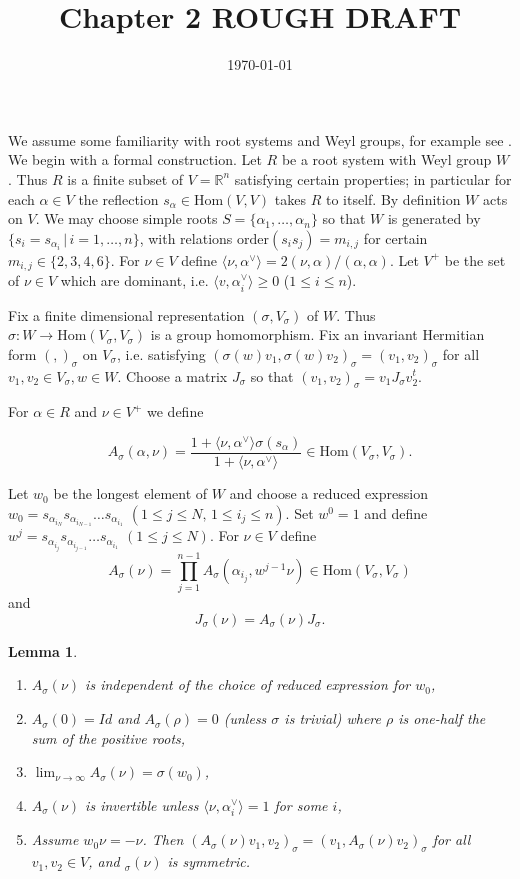 \documentclass[11pt]{amsart}
\newtheorem{lemma}[equation]{Lemma}
\newcommand{\R}{{\mathbb R}}
\newcommand{\ch}[1]{#1^\vee}
\newcommand\brach[2]{\langle#1,\ch#2\rangle}
\newcommand{\Hom}{\text{Hom}}
\begin{document}
\title{Chapter 2 ROUGH DRAFT}
\date{\today}
\maketitle

We assume some familiarity with root systems and Weyl groups, for example see 
\cite{humphreys_coxeter}.
We begin with a formal construction.  Let $R$ be a root system with
Weyl group $W$. Thus $R$ is a finite subset of $V=\R^n$ satisfying
certain properties; in particular for each $\alpha\in V$ the
reflection $s_\alpha\in \Hom(V,V)$ takes $R$ to itself.  By
definition $W$ acts on $V$. We may choose simple roots
$S=\{\alpha_1,\dots, \alpha_n\}$ so that $W$ is generated by
$\{s_i=s_{\alpha_i}\,|\,i=1,\dots,n\}$, with relations
$\text{order}(s_is_j)=m_{i,j}$ for certain $m_{i,j}\in\{2,3,4,6\}$.
For $\nu\in V$ define $\brach \nu\alpha=2(\nu,\alpha)/(\alpha,\alpha)$. 
Let $V^+$ be the set of $\nu\in V$ which are dominant, i.e.
$\brach v{\alpha_i}\ge0$ ($1\le i\le n$).

Fix a finite dimensional representation $(\sigma,V_\sigma)$ of $W$.
Thus $\sigma:W\rightarrow \Hom(V_\sigma,V_\sigma)$ is a group
homomorphism. Fix an invariant Hermitian form $(,)_\sigma$ on
$V_\sigma$, i.e. satisfying
$(\sigma(w)v_1,\sigma(w)v_2)_\sigma=(v_1,v_2)_\sigma$ for all $v_1,v_2\in
V_\sigma, w\in W$. 
Choose a matrix $J_\sigma$ so that $(v_1,v_2)_\sigma=v_1J_\sigma v_2^t$.


For $\alpha\in R$ and  $\nu\in V^+$ we define 

\begin{equation}
\label{A}
A_\sigma(\alpha,\nu)=\frac{1+\brach\nu{\alpha}\sigma(s_{\alpha})}{1+\brach\nu{\alpha}}
\in\Hom(V_\sigma,V_\sigma).
\end{equation}



Let $w_0$ be the longest element of $W$ and choose a reduced expression
$w_0=s_{\alpha_{i_N}}s_{\alpha_{i_{N-1}}}\dots s_{\alpha_{i_1}}$
$(1\le j\le N,\,1\le i_j\le n)$.
Set $w^0=1$  and define
$w^j=s_{\alpha_{i_j}}s_{\alpha_{i_{j-1}}}\dots s_{\alpha_{i_1}}$
$(1\le j\le N)$.
For $\nu\in V$ define
$$
A_\sigma(\nu)=\prod_{j=1}^{n-1}A_\sigma(\alpha_{i_j},w^{j-1}\nu)\in\Hom(V_\sigma,V_\sigma)
$$
and 
$$
J_\sigma(\nu)=A_\sigma(\nu)J_\sigma.
$$

\begin{lemma}
\label{properties}
\begin{enumerate}
\item $A_\sigma(\nu)$ is independent of the choice of reduced
expression for $w_0$,
\item $A_\sigma(0)=Id$ and $A_\sigma(\rho)=0$ (unless $\sigma$ is
  trivial) where $\rho$ is one-half
  the sum of the positive roots,
\item $\lim_{\nu\rightarrow\infty}A_\sigma(\nu)=\sigma(w_0)$,
\item $A_\sigma(\nu)$ is invertible unless $\brach\nu{\alpha_i}=1$ for
some $i$,
\item Assume $w_0\nu=-\nu$. Then $(A_\sigma(\nu)v_1,v_2)_\sigma=(v_1,A_\sigma(\nu)v_2)_\sigma$ for all
$v_1,v_2\in V$, and $_\sigma(\nu)$ is symmetric.
\end{enumerate}
\end{lemma}
\end{document}
